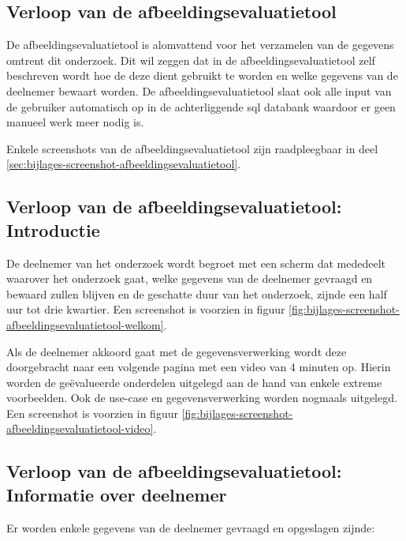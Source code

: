 \subsection{Verloop  van de afbeeldingsevaluatietool}
\label{sec:onderzoek-evaluatietool-verloop}

De \gls{afbeeldingsevaluatietool} is alomvattend voor het verzamelen van de gegevens omtrent dit onderzoek. Dit wil zeggen dat in de \gls{afbeeldingsevaluatietool} zelf beschreven wordt hoe de deze dient gebruikt te worden en welke gegevens van de deelnemer bewaart worden. De \gls{afbeeldingsevaluatietool} slaat ook alle input van de gebruiker automatisch op in de achterliggende \gls{sql} databank waardoor er geen manueel werk meer nodig is.

Enkele screenshots van de \gls{afbeeldingsevaluatietool} zijn raadpleegbaar in deel \ref{sec:bijlages-screenshot-afbeeldingsevaluatietool}.

\subsection{Verloop  van de afbeeldingsevaluatietool: Introductie}
\label{sec:onderzoek-evaluatietool-verloop-intro}

De deelnemer van het onderzoek wordt begroet met een scherm dat mededeelt waarover het onderzoek gaat, welke gegevens van de deelnemer gevraagd en bewaard zullen blijven en de geschatte duur van het onderzoek, zijnde een half uur tot drie kwartier. Een screenshot is voorzien in figuur \ref{fig:bijlages-screenshot-afbeeldingsevaluatietool-welkom}.

Als de deelnemer akkoord gaat met de gegevensverwerking wordt deze doorgebracht naar een volgende pagina met een video van 4 minuten op. Hierin worden de geëvalueerde onderdelen uitgelegd aan de hand van enkele extreme voorbeelden. Ook de \gls{use-case} en gegevensverwerking worden nogmaals uitgelegd. Een screenshot is voorzien in figuur \ref{fig:bijlages-screenshot-afbeeldingsevaluatietool-video}.

\subsection{Verloop  van de afbeeldingsevaluatietool: Informatie over deelnemer}
\label{sec:onderzoek-evaluatietool-verloop-info-participant}

Er worden enkele gegevens van de deelnemer gevraagd en opgeslagen zijnde: 

